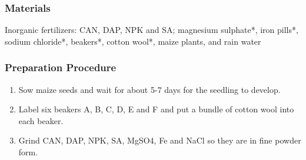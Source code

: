 \subsubsection*{Materials}
Inorganic fertilizers: CAN, DAP, NPK and SA; magnesium sulphate*, iron pills*, sodium chloride*, beakers*, cotton wool*, maize plants, and rain water

\subsubsection*{Preparation Procedure}
\begin{enumerate}
\item{Sow maize seeds and wait for about 5-7 days for the seedling to develop.}
\item{Label six beakers A, B, C, D, E and F and put a bundle of cotton wool into each beaker.}
\item{Grind CAN, DAP, NPK, SA, MgSO4, Fe and NaCl so they are in fine powder form.}
\end{enumerate}
